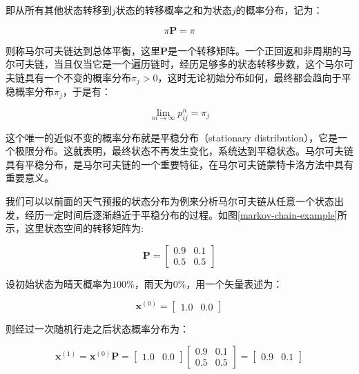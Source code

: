 \noindent 即从所有其他状态转移到$j$状态的转移概率之和为状态$j$的概率分布，记为：

\begin{equation}
	\pi \mathbf{P}=\pi
\end{equation}

\noindent 则称马尔可夫链达到总体平衡，这里$\mathbf{P}$是一个转移矩阵。一个正回返和非周期的马尔可夫链，当且仅当它是一个遍历链时，经历足够多的状态转移步数，这个马尔可夫链具有一个不变的概率分布$\pi_j>0$，这时无论初始分布如何，最终都会趋向于平稳概率分布$\pi_j$，于是有：

\begin{equation}
	\lim_{m\rightarrow \infty}p^{n}_{ij}=\pi_j
\end{equation}

这个唯一的近似不变的概率分布就是平稳分布（stationary distribution），它是一个极限分布。这就表明，最终状态不再发生变化，系统达到平稳状态。马尔可夫链具有平稳分布，是马尔可夫链的一个重要特征，在马尔可夫链蒙特卡洛方法中具有重要意义。

我们可以以前面的天气预报的状态分布为例来分析马尔可夫链从任意一个状态出发，经历一定时间后逐渐趋近于平稳分布的过程。如图\ref{markov-chain-example}所示，这里状态空间的转移矩阵为:

\begin{equation}
	\mathbf{P}=\begin{bmatrix}
		0.9 & 0.1\\0.5 & 0.5
	\end{bmatrix}
\end{equation}

\noindent 设初始状态为晴天概率为$100\%$，雨天为$0\%$，用一个矢量表述为：

\begin{equation}
	\mathbf{x}^{(0)}=\begin{bmatrix}
		1.0&0.0
	\end{bmatrix}
\end{equation}

\noindent 则经过一次随机行走之后状态概率分布为：

\begin{equation}
	\mathbf{x}^{(1)}=\mathbf{x}^{(0)}\mathbf{P}=\begin{bmatrix}
		1.0&0.0 
	\end{bmatrix}\begin{bmatrix}
		0.9&0.1\\0.5&0.5
	\end{bmatrix}=\begin{bmatrix}
		0.9&0.1
	\end{bmatrix}
\end{equation}

